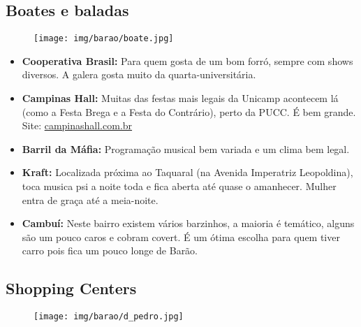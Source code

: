 \subsection{Boates e baladas}

\begin{figure}[h!]
    \centering
    \texttt{[image: img/barao/boate.jpg]}
\end{figure}

\begin{itemize}
\item \textbf{Cooperativa Brasil:} Para quem gosta de um bom forró, sempre com
  shows diversos. A galera gosta muito da quarta-universitária.

\item \textbf{Campinas Hall:} Muitas das festas mais legais da Unicamp
  acontecem lá (como a Festa Brega e a Festa do Contrário), perto da PUCC. É
  bem grande.
  \\Site: \url{campinashall.com.br}

\item \textbf{Barril da Máfia:} Programação musical bem variada e um clima bem
  legal.

\item \textbf{Kraft:} Localizada próxima ao Taquaral (na Avenida Imperatriz
  Leopoldina), toca musica psi a noite toda e fica aberta até quase o
  amanhecer. Mulher entra de graça até a meia-noite.

\item \textbf{Cambuí:} Neste bairro existem vários barzinhos, a maioria é
  temático, alguns são um pouco caros e cobram covert. É um ótima escolha para
  quem tiver carro pois fica um pouco longe de Barão.
\end{itemize}

\subsection{Shopping Centers}

\begin{figure}[h!]
    \centering
    \texttt{[image: img/barao/d\_pedro.jpg]}
\end{figure}

